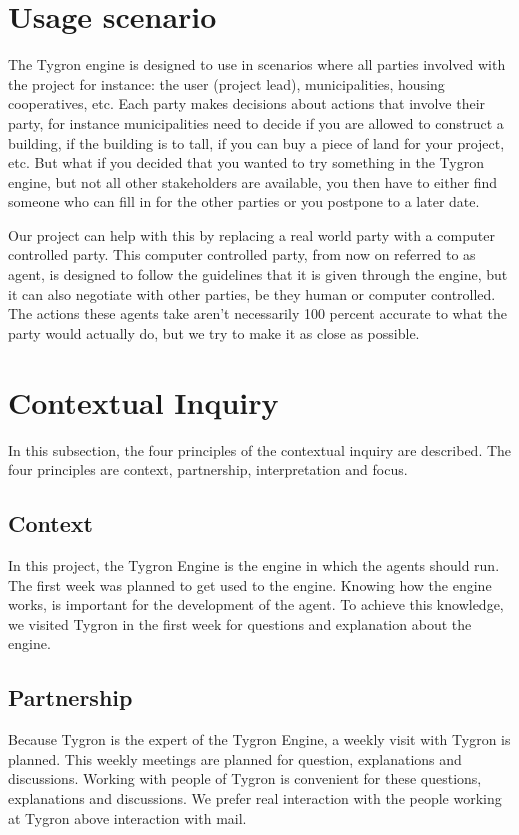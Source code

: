 \section{Usage scenario}
The Tygron engine is designed to use in scenarios where all parties involved with the project for instance: the user (project lead), municipalities, housing cooperatives, etc. Each party makes decisions about actions that involve their party, for instance municipalities need to decide if you are allowed to construct a building, if the building is to tall, if you can buy a piece of land for your project, etc. But what if you decided that you wanted to try something in the Tygron engine, but not all other stakeholders are available, you then have to either find someone who can fill in for the other parties or you postpone to a later date.

Our project can help with this by replacing a real world party with a computer controlled party. This computer controlled party, from now on referred to as agent, is designed to follow the guidelines that it is given through the engine, but it can also negotiate with other parties, be they human or computer controlled. The actions these agents take aren’t necessarily 100 percent accurate to what the party would actually do, but we try to make it as close as possible.

\newpage

\section{Contextual Inquiry}
In this subsection, the four principles of the contextual inquiry are described. The four principles are context, partnership, interpretation and focus.

\subsection{Context}
In this project, the Tygron Engine is the engine in which the agents should run. The first week was planned to get used to the engine. Knowing how the engine works, is important for the development of the agent. To achieve this knowledge, we visited Tygron in the first week for questions and explanation about the engine.  

\subsection{Partnership}
Because Tygron is the expert of the Tygron Engine, a weekly visit with Tygron is planned. This weekly meetings are planned for question, explanations and discussions. Working with people of Tygron is convenient for these questions, explanations and discussions. We prefer real interaction with the people working at Tygron above interaction with mail.

